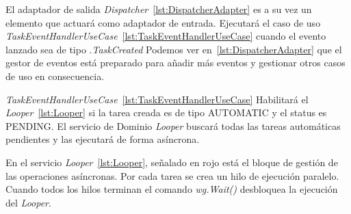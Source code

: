 

El adaptador de salida \textit{Dispatcher}~\cref{lst:DispatcherAdapter} es a su vez un elemento que actuará como adaptador de entrada.
Ejecutará el caso de uso \textit{TaskEventHandlerUseCase}~\cref{lst:TaskEventHandlerUseCase} cuando el evento lanzado sea de tipo .\textit{TaskCreated}
Podemos ver en~\cref{lst:DispatcherAdapter} que el gestor de eventos está preparado para añadir más eventos y gestionar otros casos de uso en consecuencia.

\textit{TaskEventHandlerUseCase}~\cref{lst:TaskEventHandlerUseCase} Habilitará el \textit{Looper}~\cref{lst:Looper} si la tarea creada es de tipo AUTOMATIC y el status es PENDING\@.
El servicio de Dominio \textit{Looper} buscará todas las tareas automáticas pendientes y las ejecutará de forma asíncrona.

En el servicio \textit{Looper}~\cref{lst:Looper}, señalado en rojo está el bloque de gestión de las operaciones asíncronas.
Por cada tarea se crea un hilo de ejecución paralelo.
Cuando todos los hilos terminan el comando \textit{wg.Wait()} desbloquea la ejecución del \textit{Looper}.




